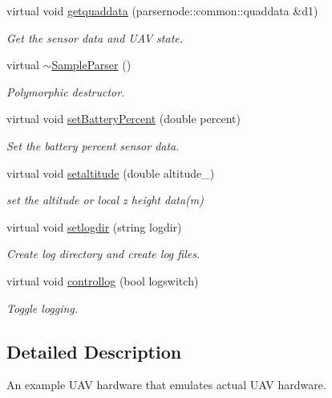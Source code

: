 \begin{DoxyCompactItemize}
virtual void \hyperlink{classSampleParser_af1be68e602c959d8b1ab29d651ed379c}{getquaddata} (parsernode\-::common\-::quaddata \&d1)
\begin{DoxyCompactList}\small\item\em Get the sensor data and U\-A\-V state. \end{DoxyCompactList}\item 
virtual \hyperlink{classSampleParser_afc4af7450f685341c09e2c00af95ff73}{$\sim$\-Sample\-Parser} ()
\begin{DoxyCompactList}\small\item\em Polymorphic destructor. \end{DoxyCompactList}\item 
virtual void \hyperlink{classSampleParser_a293772680222eb4f7c49c26d42e69eaa}{set\-Battery\-Percent} (double percent)
\begin{DoxyCompactList}\small\item\em Set the battery percent sensor data. \end{DoxyCompactList}\item 
virtual void \hyperlink{classSampleParser_a98153bd7644b1ca0eb12b442ec54034f}{setaltitude} (double altitude\-\_\-)
\begin{DoxyCompactList}\small\item\em set the altitude or local z height data(m) \end{DoxyCompactList}\item 
virtual void \hyperlink{classSampleParser_aaf4d068b2dabd1ca8da12f7109b288c4}{setlogdir} (string logdir)
\begin{DoxyCompactList}\small\item\em Create log directory and create log files. \end{DoxyCompactList}\item 
virtual void \hyperlink{classSampleParser_a78923bbce68debb4d035a2d8b25f7d6d}{controllog} (bool logswitch)
\begin{DoxyCompactList}\small\item\em Toggle logging. \end{DoxyCompactList}\end{DoxyCompactItemize}


\subsection{Detailed Description}
An example U\-A\-V hardware that emulates actual U\-A\-V hardware. 

